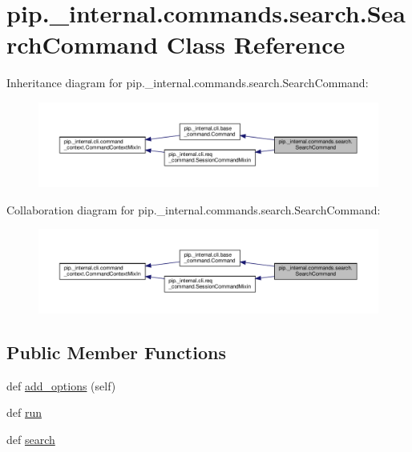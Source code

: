 \hypertarget{classpip_1_1__internal_1_1commands_1_1search_1_1SearchCommand}{}\section{pip.\+\_\+internal.\+commands.\+search.\+Search\+Command Class Reference}
\label{classpip_1_1__internal_1_1commands_1_1search_1_1SearchCommand}


Inheritance diagram for pip.\+\_\+internal.\+commands.\+search.\+Search\+Command\+:
\nopagebreak
\begin{figure}[H]
\begin{center}
\leavevmode
\includegraphics[width=350pt]{classpip_1_1__internal_1_1commands_1_1search_1_1SearchCommand__inherit__graph}
\end{center}
\end{figure}


Collaboration diagram for pip.\+\_\+internal.\+commands.\+search.\+Search\+Command\+:
\nopagebreak
\begin{figure}[H]
\begin{center}
\leavevmode
\includegraphics[width=350pt]{classpip_1_1__internal_1_1commands_1_1search_1_1SearchCommand__coll__graph}
\end{center}
\end{figure}
\subsection*{Public Member Functions}
\begin{DoxyCompactItemize}
\item 
def \hyperlink{classpip_1_1__internal_1_1commands_1_1search_1_1SearchCommand_a380e80b4ddaf57b94794a8249835f88b}{add\+\_\+options} (self)
\item 
def \hyperlink{classpip_1_1__internal_1_1commands_1_1search_1_1SearchCommand_a6956329d7dafbad1986db5f94b2a614b}{run}
\item 
def \hyperlink{classpip_1_1__internal_1_1commands_1_1search_1_1SearchCommand_a769213c75dd32e9faa116f81a87a3c24}{search}
\end{DoxyCompactItemize}
